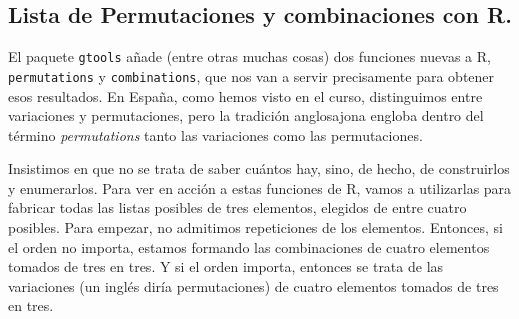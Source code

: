 \documentclass[10pt,a4paper]{article}\usepackage[]{graphicx}\usepackage[]{color}
\begin{document}
\subsection{Lista de Permutaciones y combinaciones con R.}
\label{tut03:subsec:PermutacionesCombinacionesR}

El paquete {\tt gtools} añade (entre otras muchas cosas) dos funciones nuevas a R, {\tt permutations} y {\tt combinations}, que nos van a servir precisamente para obtener esos resultados. En España, como hemos visto en el curso, distinguimos entre variaciones y permutaciones, pero la tradición anglosajona engloba dentro del término {\em permutations} tanto las variaciones como las permutaciones.

Insistimos en que no se trata de saber cuántos hay, sino, de hecho, de construirlos y enumerarlos. Para ver en acción a estas funciones de R, vamos a utilizarlas para fabricar todas las listas posibles de tres elementos, elegidos de entre cuatro posibles. Para empezar, no admitimos repeticiones de los elementos. Entonces, si el orden no importa, estamos formando las combinaciones de cuatro elementos tomados de tres en tres. Y si el orden importa, entonces se trata de las variaciones (un inglés diría permutaciones) de cuatro elementos tomados de tres en tres.
\end{document}
